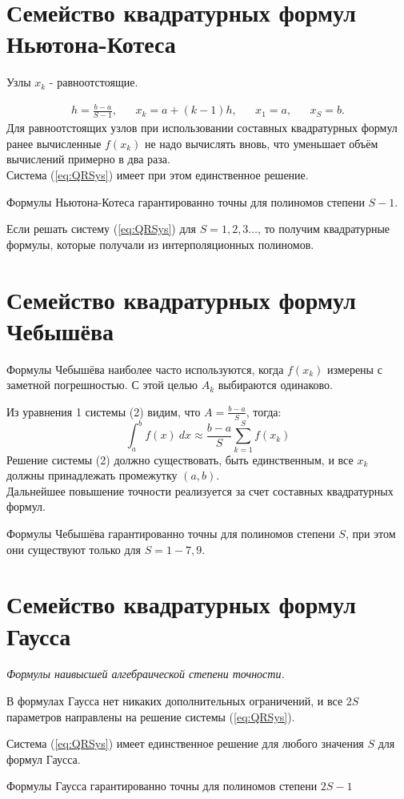 \documentclass[a4paper,11pt]{article}
\begin{document}
\section{Семейство квадратурных формул Ньютона-Котеса}
\begin{importantblock}
  Узлы $x_k$ - равноотстоящие.
\end{importantblock}
\begin{align*}
  h = \frac{b-a}{S-1}, && x_k=a+(k-1)h, && x_1=a, && x_S=b.
\end{align*}
Для равноотстоящих узлов при использовании составных квадратурных формул ранее вычисленные $f(x_k)$ не надо вычислять вновь, что
уменьшает объём вычислений примерно в два раза. \\
Система (\ref{eq:QRSys}) имеет при этом единственное решение.
\begin{importantblock}
  Формулы Ньютона-Котеса гарантированно точны для полиномов степени $S-1$.
\end{importantblock}
Если решать систему (\ref{eq:QRSys}) для $S = 1, 2, 3\dots$, то получим квадратурные формулы, которые получали из интерполяционных полиномов.

\section{Семейство квадратурных формул Чебышёва}
\begin{importantblock}
  Формулы Чебышёва наиболее часто используются, когда $f(x_k)$ измерены с заметной погрешностью. С этой целью $A_k$ выбираются одинаково.
\end{importantblock}
Из уравнения 1 системы (2) видим, что $A = \frac{b-a}{S}$, тогда:
\[\int_a^b f(x)\ dx \approx \frac{b-a}{S} \sum_{k=1}^S f(x_k)\]
Решение системы (2) должно существовать, быть единственным, и все $x_k$ должны принадлежать промежутку $(a, b)$. \\
Дальнейшее повышение точности реализуется за счет составных квадратурных формул.
\begin{importantblock}
  Формулы Чебышёва гарантированно точны для полиномов степени $S$, при этом они существуют только для $S = 1-7, 9$.
\end{importantblock}

\section{Семейство квадратурных формул Гаусса}
\textit{Формулы наивысшей алгебраической степени точности.}
\begin{importantblock}
  В формулах Гаусса нет никаких дополнительных ограничений, и все $2S$ параметров направлены на решение системы (\ref{eq:QRSys}).
\end{importantblock}
Система (\ref{eq:QRSys}) имеет единственное решение для любого значения $S$ для формул Гаусса.
\begin{importantblock}
  Формулы Гаусса гарантированно точны для полиномов степени $2S-1$
\end{importantblock}
\end{document}
